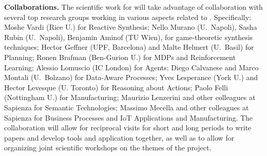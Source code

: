 \textbf{Collaborations.}
The scientific work for will take advantage of  collaboration with several top research groups working in various aspects related to \project. Specifically:
Moshe Vardi (Rice U.) for Reactive Synthesis;
%
Nello Murano (U.\ Napoli), Sasha Rubin (U.\ Napoli), Benjamin Aminof (TU Wien), for game-theoretic synthesis techniques;%
%
Hector Geffner (UPF, Barcelona)
 and Malte Helmert (U.\ Basil) for Planning;
%
Ronen Brafman (Ben-Gurion U.) for MDPs and Reinforcement Learning;
%
Alessio Lomuscio (IC London) for Agents;
%
Diego Calvanese and Marco Montali (U.\ Bolzano) for Data-Aware Processes;
%
Yves Lesperance (York U.) and Hector Levesque (U. Toronto) for Reasoning about Actions;
%
Paolo Felli (Nottingham U.) for Manufacturing;
%
Maurizio Lenzerini and other colleagues at Sapienza for Semantic Technologies;
%
Massimo Mecella and other colleagues at Sapienza for Business Processes and IoT Applications and Manufacturing.
The collaboration will allow for reciprocal visits for short and long
periods to write papers and develop tools and application together, as
well as to allow for organizing joint scientific workshops on the themes
of the project.

